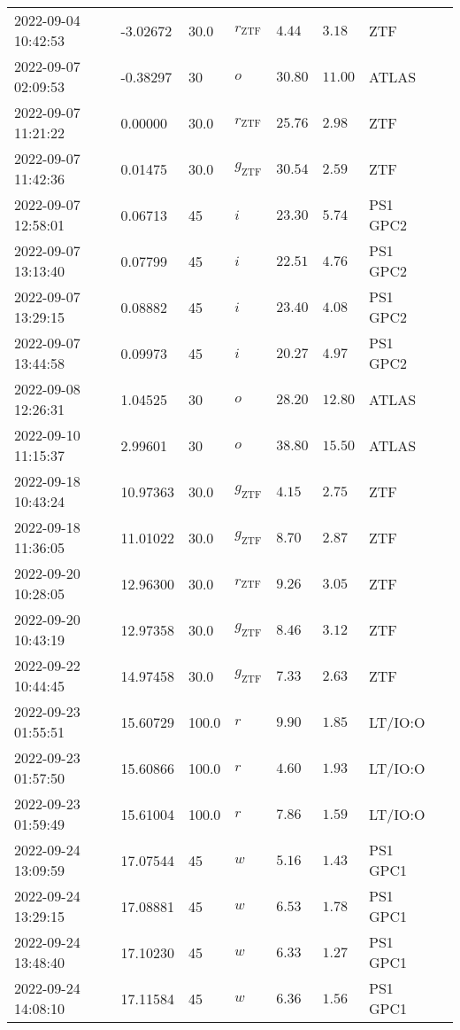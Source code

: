 \documentclass{nature_plusfigure}
\begin{document}
\begin{supplement}
\begin{center}
\begin{longtable}{llllllll}
2022-09-04 10:42:53 & -3.02672 & 30.0 & ${r}_\mathrm{ZTF}$ & $4.44$ & $3.18$ & ZTF &  \\ 
2022-09-07 02:09:53 & -0.38297 & 30 & $o$ & $30.80$ & $11.00$ & ATLAS &  \\ 
2022-09-07 11:21:22 & 0.00000 & 30.0 & ${r}_\mathrm{ZTF}$ & $25.76$ & $2.98$ & ZTF &  \\ 
2022-09-07 11:42:36 & 0.01475 & 30.0 & ${g}_\mathrm{ZTF}$ & $30.54$ & $2.59$ & ZTF &  \\ 
2022-09-07 12:58:01 & 0.06713 & 45 & $i$ & $23.30$ & $5.74$ & PS1 GPC2 &  \\ 
2022-09-07 13:13:40 & 0.07799 & 45 & $i$ & $22.51$ & $4.76$ & PS1 GPC2 &  \\ 
2022-09-07 13:29:15 & 0.08882 & 45 & $i$ & $23.40$ & $4.08$ & PS1 GPC2 &  \\ 
2022-09-07 13:44:58 & 0.09973 & 45 & $i$ & $20.27$ & $4.97$ & PS1 GPC2 &  \\ 
2022-09-08 12:26:31 & 1.04525 & 30 & $o$ & $28.20$ & $12.80$ & ATLAS &  \\ 
2022-09-10 11:15:37 & 2.99601 & 30 & $o$ & $38.80$ & $15.50$ & ATLAS &  \\ 
2022-09-18 10:43:24 & 10.97363 & 30.0 & ${g}_\mathrm{ZTF}$ & $4.15$ & $2.75$ & ZTF &  \\ 
2022-09-18 11:36:05 & 11.01022 & 30.0 & ${g}_\mathrm{ZTF}$ & $8.70$ & $2.87$ & ZTF &  \\ 
2022-09-20 10:28:05 & 12.96300 & 30.0 & ${r}_\mathrm{ZTF}$ & $9.26$ & $3.05$ & ZTF &  \\ 
2022-09-20 10:43:19 & 12.97358 & 30.0 & ${g}_\mathrm{ZTF}$ & $8.46$ & $3.12$ & ZTF &  \\ 
2022-09-22 10:44:45 & 14.97458 & 30.0 & ${g}_\mathrm{ZTF}$ & $7.33$ & $2.63$ & ZTF &  \\ 
2022-09-23 01:55:51 & 15.60729 & 100.0 & $r$ & $9.90$ & $1.85$ & LT/IO:O &  \\ 
2022-09-23 01:57:50 & 15.60866 & 100.0 & $r$ & $4.60$ & $1.93$ & LT/IO:O &  \\ 
2022-09-23 01:59:49 & 15.61004 & 100.0 & $r$ & $7.86$ & $1.59$ & LT/IO:O &  \\ 
2022-09-24 13:09:59 & 17.07544 & 45 & $w$ & $5.16$ & $1.43$ & PS1 GPC1 &  \\ 
2022-09-24 13:29:15 & 17.08881 & 45 & $w$ & $6.53$ & $1.78$ & PS1 GPC1 &  \\ 
2022-09-24 13:48:40 & 17.10230 & 45 & $w$ & $6.33$ & $1.27$ & PS1 GPC1 &  \\ 
2022-09-24 14:08:10 & 17.11584 & 45 & $w$ & $6.36$ & $1.56$ & PS1 GPC1 &  \\ 

\end{longtable}
\end{center}
\end{supplement}
\end{document}
